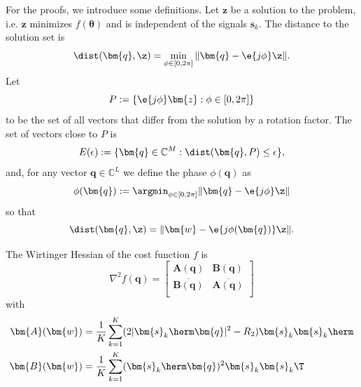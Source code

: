 For the proofs, we introduce some definitions. Let $\bm{z}$ be a solution to the problem, i.e. $\bm{z}$ minimizes $f(\bm{\theta})$ and is independent of the signals $\bm{s}_k$. The distance to the solution set is
\begin{equation}
\dist(\bm{q},\z)=\min_{\phi\in[0,2\pi]}\|\bm{q}-\e{j\phi}\z\|.
\end{equation}
Let
\begin{equation}
P:=\{\e{j\phi}\bm{z}:\phi\in[0,2\pi]\}
\end{equation}
to be the set of all vectors that differ from the solution by a rotation factor. The set of vectors close to $P$ is
\begin{equation}
E(\epsilon):=\{\bm{q}\in\mathbb{C}^M:\dist(\bm{q},P)\leq\epsilon\},
\end{equation}
and, for any vector $\bm{q}\in\mathbb{C}^L$ we define the phase $\phi(\bm{q})$ as
\begin{equation}
\phi(\bm{q}):=\argmin_{\phi\in[0,2\pi]}\|\bm{q}-\e{j\phi}\z\|
\end{equation}
so that
\begin{equation}
\dist(\bm{q},\z)=\|\bm{w}-\e{j\phi(\bm{q})}\z\|.
\end{equation}

The Wirtinger Hessian of the cost function $f$ is
\begin{equation}
\nabla^2 f(\bm{q})=\begin{bmatrix}
\bm{A}(\bm{q}) & \bm{B}(\bm{q})\\
\overline{\bm{B}(\bm{q})} & \overline{\bm{A}(\bm{q})}\\
\end{bmatrix}\label{eqn:hessian}
\end{equation}
with
\begin{subequations}
	\label{eqn:hessianMatrices}
	\begin{align}
	\bm{A}(\bm{w}) &= \frac{1}{K}\sum_{k=1}^K(2|\bm{s}_k\herm\bm{q}|^2-R_2)\bm{s}_k\bm{s}_k\herm \label{eqn:hessianA}\\
	\bm{B}(\bm{w}) &= \frac{1}{K}\sum_{k=1}^K(\bm{s}_k\herm\bm{q})^2\bm{s}_k\bm{s}_k\T  \label{eqn:hessianB}
	\end{align}
\end{subequations}

